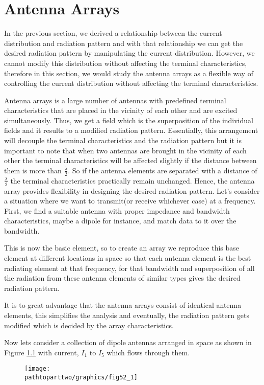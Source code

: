 \chapter{Antenna Arrays}
In the previous section, we derived a relationship between the current distribution and radiation pattern and with that relationship we can get the desired radiation pattern by manipulating the current distribution. However, we cannot modify this distribution without affecting the terminal characteristics, therefore in this section, we would study the antenna arrays as a flexible way of controlling the current distribution without affecting the terminal characteristics.

Antenna arrays is a large number of antennas with predefined terminal characteristics that are placed in the vicinity of each other and are excited simultaneously. Thus, we get a field which is the superposition of the individual fields and it results to a modified radiation pattern. Essentially, this arrangement will decouple the terminal characteristics and the radiation pattern but it is important to note that when two antennas are brought in the vicinity of each other the terminal characteristics will be affected slightly if the distance between them is more than $ \frac{\lambda}{2}$. So if the antenna elements are separated with a distance of $ \frac{\lambda}{2} $ the terminal characteristics practically remain unchanged. Hence, the antenna array provides flexibility in designing the desired radiation pattern. Let's consider a situation where we want to transmit(or receive whichever case) at a frequency. First, we find a suitable antenna with proper impedance and bandwidth characteristics, maybe a dipole for instance, and match data to it over the bandwidth.

This is now the basic element, so to create an array we reproduce this base element at different locations in space so that each antenna element is the best radiating element at that frequency, for that bandwidth and superposition of all the radiation from these antenna elements of similar types gives the desired radiation pattern.

It is to great advantage that the antenna arrays consist of identical antenna elements, this simplifies the analysis and eventually, the radiation pattern gets modified which is decided by the array characteristics.

Now lets consider a collection of dipole antennas arranged in space as shown in Figure \ref{52.1} with current, $I_1$ to $I_5$ which flows through them.
\begin{figure}[h]
\centering
\texttt{[image: \\pathtoparttwo/graphics/fig52\_1]}
\caption{}
\label{52.1}
\end{figure}

